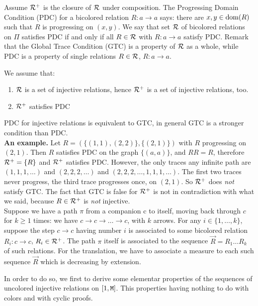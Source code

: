 \documentclass{lmcs}
\begin{document}
Assume ${\mathcal R}^+$ is the closure of ${\mathcal R}$ under composition. The Progressing Domain 
Condition (PDC) for a bicolored relation $R : a \rightarrow a$ says: 
there are $x, y \in {\rm dom}(R)$ such that $R$ is progressing on $(x,y)$.
We say that set ${\mathcal R}$ of bicolored relations on $\Pi$
satisfies PDC if and only if all $R \in {\mathcal R}$ with $R: a \rightarrow a$ satisfy PDC. 
Remark that the Global Trace Condition (GTC) is a property of ${\mathcal R}$ as a whole, 
while PDC is a property of single relations $R \in {\mathcal R}$, $R:a \rightarrow a$. 

We assume that:

\begin{enumerate}
\item  
${\mathcal R}$ is a set of injective relations, hence ${\mathcal R}^+$ is a set of injective relations, too.
\item
${\mathcal R}^+$ satisfies PDC 
\end{enumerate}

PDC for injective relations is equivalent to GTC, in general GTC is a stronger condition
than PDC. 
\\

{\bf An example.} Let $R = (\{(1,1),(2,2)\},\{(2,1)\})$ with $R$ progressing
on $(2,1)$. Then $R$ satisfies PDC on the graph $\{(a,a)\}$, and $RR=R$, 
therefore  ${\mathcal R}^+=\{R\}$ and ${\mathcal R}^+$ satisfies PDC. However, the only traces any
infinite path are $(1,1,1,\ldots)$ and $(2,2,2,\ldots)$ and $(2,2,2,\ldots,1,1,1,\ldots)$. The
first two traces never progress, the third trace progresses once, on $(2,1)$. So ${\mathcal R}^+$
does \emph{not} satisfy GTC. The fact that GTC is false for ${\mathcal R}^+$ 
is not in contradiction with what we said, because $R \in {\mathcal R}^+$ is  \emph{not} injective.
\\

Suppose we have a path $\pi$ from a companion c to itself, moving back  through $c$
for $k \ge 1$ times: we have $c \rightarrow c \rightarrow \ldots \rightarrow c$, with $k$ arrows.
For any $i \in \{1, \ldots, k\}$, suppose the step $c \rightarrow c$ having number $i$
is associated to some bicolored relation $R_i : c \rightarrow c$, $R_i \in {\mathcal R}^+$. 
The path $\pi$ itself is associated to the sequence $\vec{R} = R_1 \ldots R_k$ of such relations. 
For the translation, we have to associate a measure to each such sequence $\vec{R}$
which is decreasing by extension.

In order to do so, we first to derive some elementar properties of the sequences of uncolored injective relations on $[1,{\tt M}]$. This properties having nothing to do with colors and
with cyclic proofs.
\end{document}

